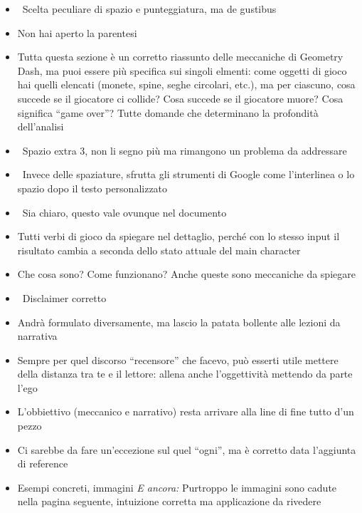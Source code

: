 {\begin{itemize}
  \item \rvVuoto\ Scelta peculiare di spazio e punteggiatura, ma de gustibus
  \item \rvAncora{)} Non hai aperto la parentesi
  \item {} Tutta questa sezione è un corretto riassunto delle meccaniche di Geometry Dash, ma puoi essere più specifica sui singoli elmenti: come oggetti di gioco hai quelli elencati (monete, spine, seghe circolari, etc.), ma per ciascuno, cosa succede se il giocatore ci collide? Cosa succede se il giocatore muore? Cosa significa ``game over''? Tutte domande che determinano la profondità dell'analisi
  \item \rvVuoto\ Spazio extra 3, non li segno più ma rimangono un problema da addressare
  \item \rvVuoto\ Invece delle spaziature, sfrutta gli strumenti di Google come l'interlinea o lo spazio dopo il testo personalizzato
  \item \rvVuoto\ Sia chiaro, questo vale ovunque nel documento
  \item {} Tutti verbi di gioco da spiegare nel dettaglio, perché con lo stesso input il risultato cambia a seconda dello stato attuale del main character
  \item {} Che cosa sono? Come funzionano? Anche queste sono meccaniche da spiegare
  \item {} \rvBene\ Disclaimer corretto
  \item {} Andrà formulato diversamente, ma lascio la patata bollente alle lezioni da narrativa
  \item {} Sempre per quel discorso ``recensore'' che facevo, può esserti utile mettere della distanza tra te e il lettore: allena anche l'oggettività mettendo da parte l'ego
  \item {} L'obbiettivo (meccanico e narrativo) resta arrivare alla line di fine tutto d'un pezzo
  \item {} Ci sarebbe da fare un'eccezione sul quel ``ogni'', ma è corretto data l'aggiunta di reference
  \item {} Esempi concreti, immagini \emph{E ancora:} Purtroppo le immagini sono cadute nella pagina seguente, intuizione corretta ma applicazione da rivedere

\end{itemize}}
